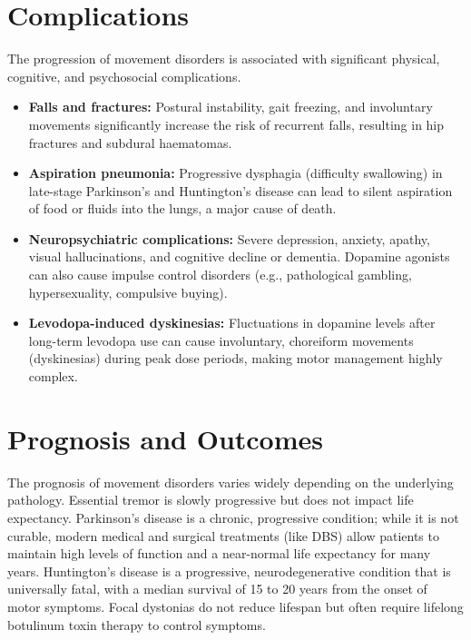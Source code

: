 \section*{Complications}
The progression of movement disorders is associated with significant physical, cognitive, and psychosocial complications.
\begin{itemize}
    \item \textbf{Falls and fractures:} Postural instability, gait freezing, and involuntary movements significantly increase the risk of recurrent falls, resulting in hip fractures and subdural haematomas.
    \item \textbf{Aspiration pneumonia:} Progressive dysphagia (difficulty swallowing) in late-stage Parkinson's and Huntington's disease can lead to silent aspiration of food or fluids into the lungs, a major cause of death.
    \item \textbf{Neuropsychiatric complications:} Severe depression, anxiety, apathy, visual hallucinations, and cognitive decline or dementia. Dopamine agonists can also cause impulse control disorders (e.g., pathological gambling, hypersexuality, compulsive buying).
    \item \textbf{Levodopa-induced dyskinesias:} Fluctuations in dopamine levels after long-term levodopa use can cause involuntary, choreiform movements (dyskinesias) during peak dose periods, making motor management highly complex.
\end{itemize}

\section*{Prognosis and Outcomes}
The prognosis of movement disorders varies widely depending on the underlying pathology. Essential tremor is slowly progressive but does not impact life expectancy. Parkinson's disease is a chronic, progressive condition; while it is not curable, modern medical and surgical treatments (like DBS) allow patients to maintain high levels of function and a near-normal life expectancy for many years. Huntington's disease is a progressive, neurodegenerative condition that is universally fatal, with a median survival of 15 to 20 years from the onset of motor symptoms. Focal dystonias do not reduce lifespan but often require lifelong botulinum toxin therapy to control symptoms.

